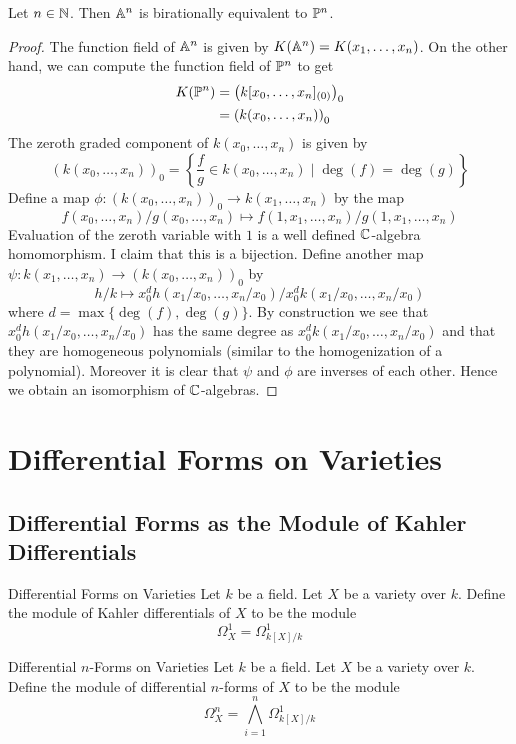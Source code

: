 \documentclass[a4paper]{article}
\begin{document}
\begin{lmm}{}{} Let $n\in\mathbb{N}$. Then $\mathbb{A}^n$ is birationally equivalent to $\mathbb{P}^n$. \tcbline
\begin{proof}
The function field of $\mathbb{A}^n$ is given by $K(\mathbb{A}^n)=K(x_1,\dots,x_n)$. On the other hand, we can compute the function field of $\mathbb{P}^n$ to get 
\begin{align*}
K(\mathbb{P}^n)&=\left(k[x_0,\dots,x_n]_{(0)}\right)_0\\
&=\left(k(x_0,\dots,x_n)\right)_0
\end{align*}
The zeroth graded component of $k(x_0,\dots,x_n)$ is given by $$(k(x_0,\dots,x_n))_0=\left\{\frac{f}{g}\in k(x_0,\dots,x_n)\;|\;\deg(f)=\deg(g)\right\}$$ Define a map $\phi:(k(x_0,\dots,x_n))_0\to k(x_1,\dots,x_n)$ by the map $$f(x_0,\dots,x_n)/g(x_0,\dots,x_n)\mapsto f(1,x_1,\dots,x_n)/g(1,x_1,\dots,x_n)$$ Evaluation of the zeroth variable with $1$ is a well defined $\mathbb{C}$-algebra homomorphism. I claim that this is a bijection. Define another map $\psi:k(x_1,\dots,x_n)\to(k(x_0,\dots,x_n))_0$ by $$h/k\mapsto x_0^d h(x_1/x_0,\dots,x_n/x_0)/x_0^d k(x_1/x_0,\dots,x_n/x_0)$$ where $d=\max\{\deg(f),\deg(g)\}$. By construction we see that $x_0^d h(x_1/x_0,\dots,x_n/x_0)$ has the same degree as $x_0^d k(x_1/x_0,\dots,x_n/x_0)$ and that they are homogeneous polynomials (similar to the homogenization of a polynomial). Moreover it is clear that $\psi$ and $\phi$ are inverses of each other. Hence we obtain an isomorphism of $\mathbb{C}$-algebras. 
\end{proof}
\end{lmm}

\pagebreak
\section{Differential Forms on Varieties}
\subsection{Differential Forms as the Module of Kahler Differentials}
\begin{defn}{Differential Forms on Varieties}{} Let $k$ be a field. Let $X$ be a variety over $k$. Define the module of Kahler differentials of $X$ to be the module $$\Omega_X^1=\Omega_{k[X]/k}^1$$
\end{defn}

\begin{defn}{Differential $n$-Forms on Varieties}{} Let $k$ be a field. Let $X$ be a variety over $k$. Define the module of differential $n$-forms of $X$ to be the module $$\Omega_X^n=\bigwedge_{i=1}^n\Omega_{k[X]/k}^1$$
\end{defn}
\end{document}
